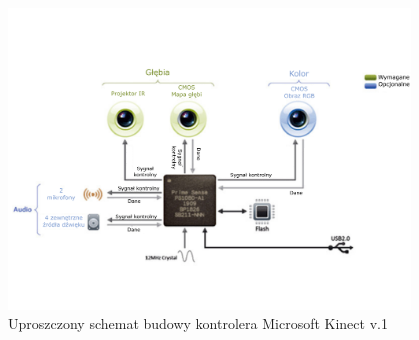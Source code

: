 \begin{figure}
	\centering
	\includegraphics[width=0.95\textwidth]{images/kinectSchema.png}
	\caption{Uproszczony schemat budowy kontrolera Microsoft Kinect v.1 \cite{kinectFixit2016}}
	\label{fig:characteristics:kinect:inside} 
\end{figure}
		
